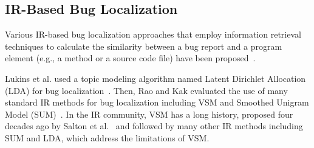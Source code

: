 \subsection{IR-Based Bug Localization} 

Various IR-based bug localization approaches that employ information retrieval techniques to calculate the similarity between a bug report and a program element (e.g., a method or a source code file) have been proposed~\cite{Rao:2011:RSL:1985441.1985451,Lukins:2010:BLU:1824820.1824850,LeWL13,Sisman:2012:IVH:2664446.2664454,Zhou:2012:BFM:2337223.2337226,SahaLKP13,WL14,WangLL14,YeBL14}. 

Lukins et al. used a topic modeling algorithm named Latent Dirichlet Allocation (LDA) for bug localization~\cite{Lukins:2010:BLU:1824820.1824850}. Then, Rao and Kak evaluated the use of many standard IR methods for bug localization including VSM and Smoothed Unigram Model (SUM)~\cite{Rao:2011:RSL:1985441.1985451}. In the IR community, VSM has a long history, proposed four decades ago by Salton et al.~\cite{SaltonWY75} and followed by many other IR methods including SUM and LDA, which address the limitations of VSM.


